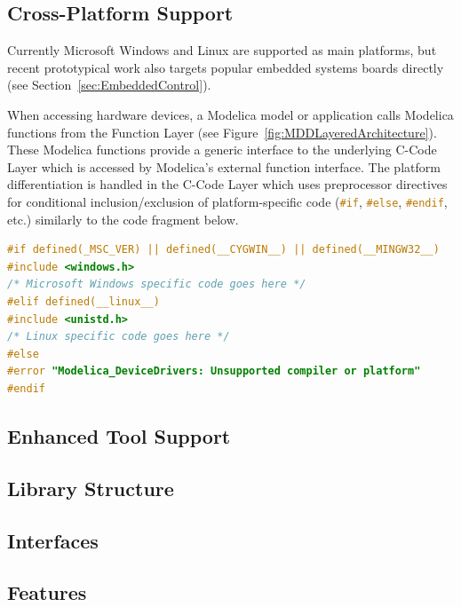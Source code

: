 \documentclass{resources/modelica}
\newcommand{\clang}[1]{\lstinline[language=c]|#1|}
\begin{document}
\subsection{Cross-Platform Support}
\label{sec:CrossPlatformSupport}

Currently Microsoft Windows and Linux are supported as main platforms, but recent
prototypical work also targets popular embedded systems boards directly (see
Section~\ref{sec:EmbeddedControl}).

When accessing hardware devices, a Modelica model or
application calls Modelica functions from the \textsf{Function Layer} (see
Figure~\ref{fig:MDDLayeredArchitecture}). These Modelica functions provide a
generic interface to the underlying \textsf{C-Code Layer} which is accessed by
Modelica's external function interface.
The platform differentiation is handled in the \textsf{C-Code Layer} which
uses preprocessor directives for conditional inclusion/exclusion of
platform-specific code (\mbox{\clang{#if}}, \clang{#else}, \clang{#endif}, etc.)
similarly to the code fragment below.
\begin{lstlisting}[language=C]
#if defined(_MSC_VER) || defined(__CYGWIN__) || defined(__MINGW32__)
#include <windows.h>
/* Microsoft Windows specific code goes here */
#elif defined(__linux__)
#include <unistd.h>
/* Linux specific code goes here */
#else
#error "Modelica_DeviceDrivers: Unsupported compiler or platform"
#endif
\end{lstlisting}

\subsection{Enhanced Tool Support}
\subsection{Library Structure}
\subsection{Interfaces}

\subsection{Features}
\end{document}
